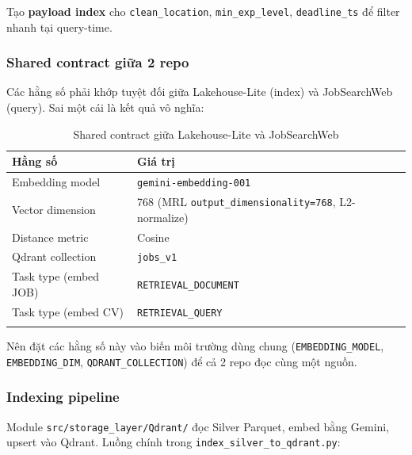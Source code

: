 Tạo \textbf{payload index} cho \texttt{clean\_location},
\texttt{min\_exp\_level}, \texttt{deadline\_ts} để filter nhanh tại query-time.

\subsubsection{Shared contract giữa 2 repo}
\label{subsubsec:qdrant-contract}

Các hằng số phải khớp tuyệt đối giữa Lakehouse-Lite (index) và JobSearchWeb
(query). Sai một cái là kết quả vô nghĩa:

\begin{longtable}{ll}
\toprule
\textbf{Hằng số} & \textbf{Giá trị} \\
\midrule
Embedding model & \texttt{gemini-embedding-001} \\
Vector dimension & 768 (MRL \texttt{output\_dimensionality=768}, L2-normalize) \\
Distance metric & Cosine \\
Qdrant collection & \texttt{jobs\_v1} \\
Task type (embed JOB) & \texttt{RETRIEVAL\_DOCUMENT} \\
Task type (embed CV) & \texttt{RETRIEVAL\_QUERY} \\
\bottomrule
\caption{Shared contract giữa Lakehouse-Lite và JobSearchWeb}
\label{tab:qdrant-contract}
\end{longtable}

Nên đặt các hằng số này vào biến môi trường dùng chung
(\texttt{EMBEDDING\_MODEL}, \texttt{EMBEDDING\_DIM},
\texttt{QDRANT\_COLLECTION}) để cả 2 repo đọc cùng một nguồn.

\subsubsection{Indexing pipeline}
\label{subsubsec:qdrant-index}

Module \texttt{src/storage\_layer/Qdrant/} đọc Silver Parquet, embed bằng
Gemini, upsert vào Qdrant. Luồng chính trong
\texttt{index\_silver\_to\_qdrant.py}:

